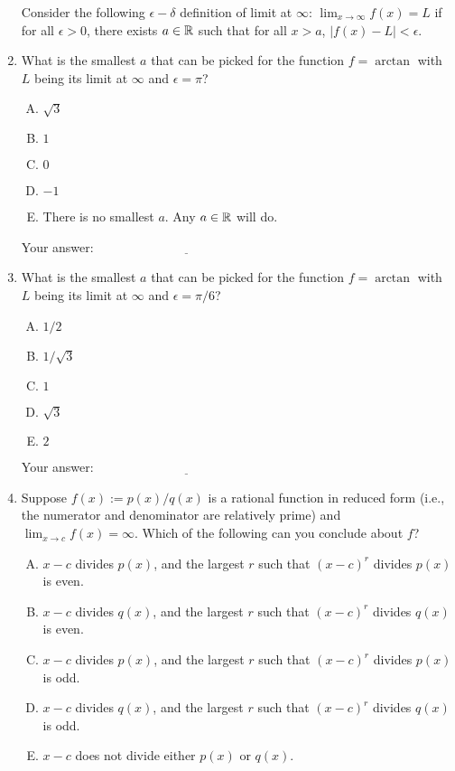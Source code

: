 \documentclass[10pt]{amsart}
\begin{document}
\begin{enumerate}
  Consider the following $\epsilon-\delta$ definition of limit at
  $\infty$: $\lim_{x \to \infty} f(x) = L$ if for all $\epsilon > 0$,
  there exists $a \in \mathbb{R}$ such that for all $x > a$, $|f(x) - L| <
  \epsilon$. 
\item What is the smallest $a$ that can be picked for the function $f
  = \arctan$ with $L$ being its limit at $\infty$ and $\epsilon =
  \pi$?
  \begin{enumerate}[(A)]
  \item $\sqrt{3}$
  \item $1$
  \item $0$
  \item $-1$
  \item There is no smallest $a$. Any $a \in \mathbb{R}$ will do.
  \end{enumerate}

  \vspace{0.1in}
  Your answer: $\underline{\qquad\qquad\qquad\qquad\qquad\qquad\qquad}$
  \vspace{0.15in}

\item What is the smallest $a$ that can be picked for the function $f
  = \arctan$ with $L$ being its limit at $\infty$ and $\epsilon =
  \pi/6$?
  \begin{enumerate}[(A)]
  \item $1/2$
  \item $1/\sqrt{3}$
  \item $1$
  \item $\sqrt{3}$
  \item $2$
  \end{enumerate}

  \vspace{0.1in}
  Your answer: $\underline{\qquad\qquad\qquad\qquad\qquad\qquad\qquad}$
  \vspace{0.15in}

\item Suppose $f(x) := p(x)/q(x)$ is a rational function in reduced form
  (i.e., the numerator and denominator are relatively prime) and
  $\lim_{x \to c} f(x) = \infty$. Which of the following can you
  conclude about $f$?
  \begin{enumerate}[(A)]
  \item $x - c$ divides $p(x)$, and the largest $r$ such that $(x -
    c)^r$ divides $p(x)$ is even.
  \item $x - c$ divides $q(x)$, and the largest $r$ such that $(x -
    c)^r$ divides $q(x)$ is even.
  \item $x - c$ divides $p(x)$, and the largest $r$ such that $(x -
    c)^r$ divides $p(x)$ is odd.
  \item $x - c$ divides $q(x)$, and the largest $r$ such that $(x -
    c)^r$ divides $q(x)$ is odd.
  \item $x - c$ does not divide either $p(x)$ or $q(x)$.
  \end{enumerate}


\end{enumerate}
\end{document}
